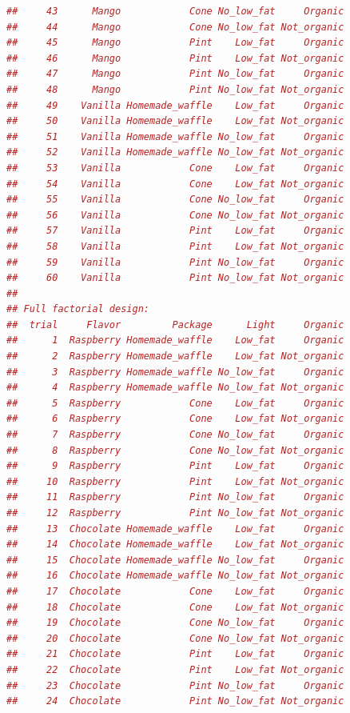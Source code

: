 \documentclass{article}
\begin{document}
\begin{lstlisting}[language=R]
##     43      Mango            Cone No_low_fat     Organic
##     44      Mango            Cone No_low_fat Not_organic
##     45      Mango            Pint    Low_fat     Organic
##     46      Mango            Pint    Low_fat Not_organic
##     47      Mango            Pint No_low_fat     Organic
##     48      Mango            Pint No_low_fat Not_organic
##     49    Vanilla Homemade_waffle    Low_fat     Organic
##     50    Vanilla Homemade_waffle    Low_fat Not_organic
##     51    Vanilla Homemade_waffle No_low_fat     Organic
##     52    Vanilla Homemade_waffle No_low_fat Not_organic
##     53    Vanilla            Cone    Low_fat     Organic
##     54    Vanilla            Cone    Low_fat Not_organic
##     55    Vanilla            Cone No_low_fat     Organic
##     56    Vanilla            Cone No_low_fat Not_organic
##     57    Vanilla            Pint    Low_fat     Organic
##     58    Vanilla            Pint    Low_fat Not_organic
##     59    Vanilla            Pint No_low_fat     Organic
##     60    Vanilla            Pint No_low_fat Not_organic
## 
## Full factorial design:
##  trial     Flavor         Package      Light     Organic
##      1  Raspberry Homemade_waffle    Low_fat     Organic
##      2  Raspberry Homemade_waffle    Low_fat Not_organic
##      3  Raspberry Homemade_waffle No_low_fat     Organic
##      4  Raspberry Homemade_waffle No_low_fat Not_organic
##      5  Raspberry            Cone    Low_fat     Organic
##      6  Raspberry            Cone    Low_fat Not_organic
##      7  Raspberry            Cone No_low_fat     Organic
##      8  Raspberry            Cone No_low_fat Not_organic
##      9  Raspberry            Pint    Low_fat     Organic
##     10  Raspberry            Pint    Low_fat Not_organic
##     11  Raspberry            Pint No_low_fat     Organic
##     12  Raspberry            Pint No_low_fat Not_organic
##     13  Chocolate Homemade_waffle    Low_fat     Organic
##     14  Chocolate Homemade_waffle    Low_fat Not_organic
##     15  Chocolate Homemade_waffle No_low_fat     Organic
##     16  Chocolate Homemade_waffle No_low_fat Not_organic
##     17  Chocolate            Cone    Low_fat     Organic
##     18  Chocolate            Cone    Low_fat Not_organic
##     19  Chocolate            Cone No_low_fat     Organic
##     20  Chocolate            Cone No_low_fat Not_organic
##     21  Chocolate            Pint    Low_fat     Organic
##     22  Chocolate            Pint    Low_fat Not_organic
##     23  Chocolate            Pint No_low_fat     Organic
##     24  Chocolate            Pint No_low_fat Not_organic

\end{lstlisting}
\end{document}
